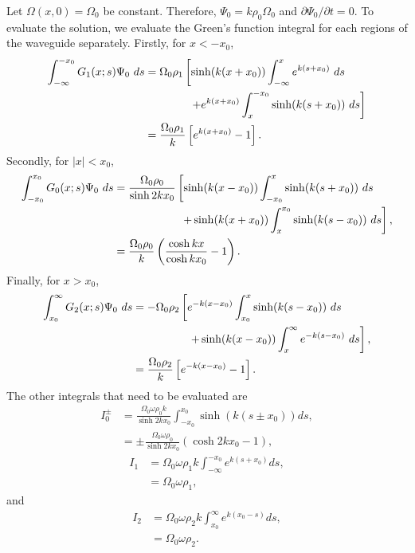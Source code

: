 \documentclass[12pt]{../style-files/ociamthesis}
\begin{document}
Let $\Omega(x, 0) = \Omega_0$ be constant. Therefore, $\Psi_0 = k\rho_0\Omega_0$ and $\partial \Psi_0 / \partial t = 0$. To evaluate the solution, we evaluate the Green's function integral for each regions of the waveguide separately. Firstly, for $x < -x_0$, 
\begin{align}
\int_{-\infty}^{-x_0} G_1(x;s) \Psi_0 ~ds &= \Omega_0 \rho_1 \left[ \sinh(k(x+x_0)) \int_{-\infty}^{x} e^{k(s + x_0)} ~ds \right . \notag \\
&\qquad \qquad \left.+ e^{k(x+x_0)} \int_{x}^{-x_0} \sinh(k(s+x_0)) ~ds \right] \notag \\
&= \frac{\Omega_0 \rho_1}{k} \left[ e^{k(x+x_0)} - 1 \right].
\end{align}
Secondly, for $|x| < x_0$,
\begin{align}
\int_{-x_0}^{x_0} G_0(x;s) \Psi_0 ~ds &= \frac{\Omega_0 \rho_0}{\sinh{2kx_0}} \left[ \sinh(k(x-x_0)) \int_{-x_0}^{x} \sinh(k(s+x_0)) ~ds \right. \notag \\
&\qquad \qquad \qquad \left. + \sinh(k(x+x_0)) \int_{x}^{x_0} \sinh(k(s-x_0)) ~ds \right], \notag \\
&= \frac{\Omega_0 \rho_0}{k} \left( \frac{\cosh{kx}}{\cosh{kx_0}} - 1 \right).
\end{align}
Finally, for $x > x_0$,
\begin{align}
\int_{x_0}^{\infty} G_2(x;s) \Psi_0 ~ds &= - \Omega_0 \rho_2 \left[ e^{-k(x-x_0)} \int_{x_0}^{x} \sinh(k(s-x_0)) ~ds \right. \notag \\
&\qquad \qquad \quad \left. + \sinh(k(x-x_0)) \int_{x}^{\infty} e^{-k(s-x_0)} ~ds \right], \notag \\
&= \frac{\Omega_0 \rho_2}{k} \left[ e^{-k(x-x_0)} - 1 \right].
\end{align}
The other integrals that need to be evaluated are
\begin{align}
I_0^\pm &= \frac{\Omega_0\omega\rho_0k}{\sinh{2kx_0}} \int_{-x_0}^{x_0} \sinh(k(s \pm x_0)) ds, \\
&= \pm \frac{\Omega_0 \omega \rho_0}{\sinh{2kx_0}} (\cosh{2kx_0 - 1}),
\end{align}
\begin{align}
I_1 &= \Omega_0\omega\rho_1k \int_{-\infty}^{-x_0} e^{k(s + x_0)} ds, \\
&= \Omega_0 \omega \rho_1,
\end{align}
and
\begin{align}
I_2 &= \Omega_0\omega\rho_2k \int_{x_0}^{\infty} e^{k(x_0 - s)} ds, \\
&= \Omega_0 \omega \rho_2.
\end{align}
\end{document}
